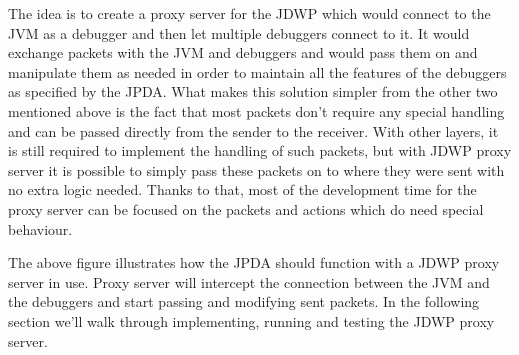 \documentclass[..thesis.tex]{subfiles}
\begin{document}
The idea is to create a proxy server for the JDWP which would connect to the JVM as a debugger and then let multiple debuggers connect to it.
It would exchange packets with the JVM and debuggers and would pass them on and manipulate them as needed in order to maintain all the features of the debuggers as specified by the JPDA.
What makes this solution simpler from the other two mentioned above is the fact that most packets don't require any special handling and can be passed directly from the sender to the receiver.
With other layers, it is still required to implement the handling of such packets, but with JDWP proxy server it is possible to simply pass these packets on to where they were sent with no extra logic needed.
Thanks to that, most of the development time for the proxy server can be focused on the packets and actions which do need special behaviour.



The above figure illustrates how the JPDA should function with a JDWP proxy server in use.
Proxy server will intercept the connection between the JVM and the debuggers and start passing and modifying sent packets.
In the following section we'll walk through implementing, running and testing the JDWP proxy server.
\end{document}
